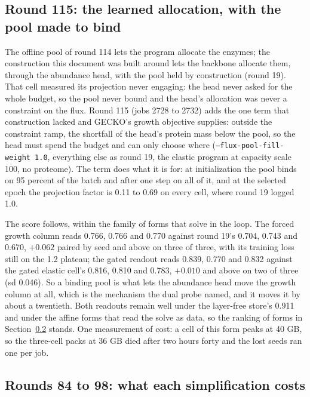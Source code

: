 \subsection{Round 115: the learned allocation, with the pool made to bind}
\label{sec:round115}

The offline pool of round 114 lets the program allocate the enzymes; the construction
this document was built around lets the backbone allocate them, through the abundance
head, with the pool held by construction (round 19). That cell measured its projection
never engaging: the head never asked for the whole budget, so the pool never bound and
the head's allocation was never a constraint on the flux. Round 115 (jobs 2728 to 2732)
adds the one term that construction lacked and GECKO's growth objective supplies: outside
the constraint ramp, the shortfall of the head's protein mass below the pool, so the head
must spend the budget and can only choose where (\texttt{--flux-pool-fill-weight 1.0},
everything else as round 19, the elastic program at capacity scale 100, no proteome).
The term does what it is for: at initialization the pool binds on 95 percent of the
batch and after one step on all of it, and at the selected epoch the projection factor
is 0.11 to 0.69 on every cell, where round 19 logged 1.0.

The score follows, within the family of forms that solve in the loop. The forced growth
column reads 0.766, 0.766 and 0.770 against round 19's 0.704, 0.743 and 0.670, $+0.062$
paired by seed and above on three of three, with its training loss still on the 1.2
plateau; the gated readout reads 0.839, 0.770 and 0.832 against the gated elastic
cell's 0.816, 0.810 and 0.783, $+0.010$ and above on two of three (sd 0.046). So a
binding pool is what lets the abundance head move the growth column at all, which is
the mechanism the dual probe named, and it moves it by about a twentieth. Both readouts
remain well under the layer-free store's 0.911 and under the affine forms that read the
solve as data, so the ranking of forms in Section~\ref{sec:round84-98} stands. One
measurement of cost: a cell of this form peaks at 40 GB, so the three-cell packs at 36
GB died after two hours forty and the lost seeds ran one per job.


\subsection{Rounds 84 to 98: what each simplification costs}
\label{sec:round84-98}

